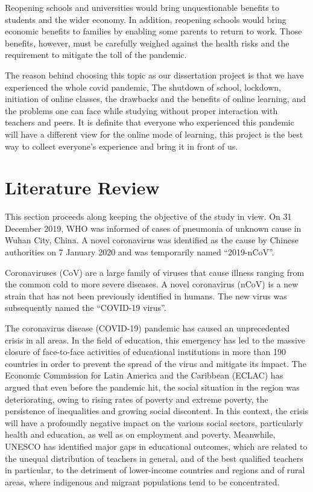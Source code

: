 \documentclass[11pt]{scrartcl}
\begin{document}
	Reopening schools and universities would bring unquestionable benefits to students and the wider economy. In addition, reopening schools would bring economic benefits to families by enabling some parents to return to work. Those benefits, however, must be carefully weighed against the health risks and the requirement to mitigate the toll of the pandemic.
	
	The reason behind choosing this topic as our dissertation project is that we have experienced the whole covid pandemic, The shutdown of school, lockdown, initiation of online classes, the drawbacks and the benefits of online learning, and the problems one can face while studying without proper interaction with teachers and peers. It is definite that everyone who experienced this pandemic will have a different view for the online mode of learning, this project is the best way to collect everyone’s experience and bring it in front of us.
	
	\pagebreak
	
	\section{Literature Review}
	
	This section proceeds along keeping the objective of the study in view. On 31 December 2019, WHO was informed of cases of pneumonia of unknown cause in Wuhan City, China. A novel coronavirus was identified as the cause by Chinese authorities on 7 January 2020 and was temporarily named “2019-nCoV”.
	
	Coronaviruses (CoV) are a large family of viruses that cause illness ranging from the common cold to more severe diseases. A novel coronavirus (nCoV) is a new strain that has not been previously identified in humans. The new virus was subsequently named the “COVID-19 virus”.
	
	The coronavirus disease (COVID-19) pandemic has caused an unprecedented crisis in all areas. In the field of education, this emergency has led to the massive closure of face-to-face activities of educational institutions in more than 190 countries in order to prevent the spread of the virus and mitigate its impact.
	The Economic Commission for Latin America and the Caribbean (ECLAC) has argued that even before the pandemic hit, the social situation in the region was deteriorating, owing to rising rates of poverty and extreme poverty, the persistence of inequalities and growing social discontent. In this context, the crisis will have a profoundly negative impact on the various social sectors, particularly health and education, as well as on employment and poverty. Meanwhile, UNESCO has identified major gaps in educational outcomes, which are related to the unequal distribution of teachers in general, and of the best qualified teachers in particular, to the detriment of lower-income countries and regions and of rural areas, where indigenous and migrant populations tend to be concentrated.
	
\end{document}
